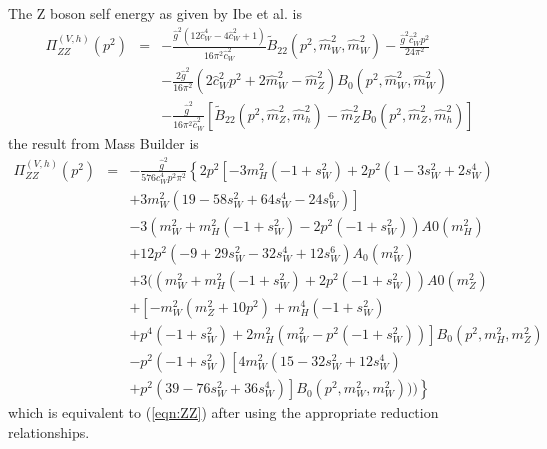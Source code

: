 \documentclass[11pt]{article}
\newcommand{\mb}{\textsf{Mass Builder} }
\begin{document}
The Z boson self energy as given by Ibe et al. \cite{Ibe2013a} is
{
\begin{eqnarray}
\Pi_{ZZ}^{(V,h)}(p^2) &=& 
-\frac{ \hat{g}^2 (12\hat{c}_W^4 - 4\hat{c}_W^2 + 1) }{16\pi^2 \hat{c}_W^2}
\tilde B_{22}(p^2, \hat{m}_W^2, \hat{m}_W^2) 
-\frac{ \hat{g}^2 \hat{c}_W^2 p^2 }{24\pi^2} \nonumber \\
&& -\frac{2\hat{g}^2}{16\pi^2}(2\hat{c}_W^2 p^2 + 2\hat{m}_W^2 - \hat{m}_Z^2)
B_0(p^2, \hat{m}_W^2, \hat{m}_W^2) \nonumber \\
&& -\frac{ \hat{g}^2 }{16\pi^2 \hat{c}_W^2}
[\tilde B_{22}(p^2, \hat{m}_Z^2, \hat{m}_h^2)\label{eqn:ZZ}
-\hat{m}_Z^2 B_0(p^2, \hat{m}_Z^2, \hat{m}_h^2) ]
\end{eqnarray}
}
the result from \mb is
{
\begin{eqnarray}
\Pi_{ZZ}^{(V,h)}(p^2) &=& 
-\frac{ \hat{g}^2} {576 c_W^4 p^2 \pi^2}\left\{
2 p^2 \left[-3 m_H^2 (-1 + s_W^2) + 2 p^2 (1 - 3 s_W^2 + 2 s_W^4) \right. \right.\nonumber\\
&& \left.+ 3 m_W^2 (19 - 58 s_W^2 + 64 s_W^4 - 24 s_W^6)\right] \nonumber\\
&&- 3 (m_W^2 + m_H^2 (-1 + s_W^2) - 2 p^2 (-1 + s_W^2)) A0\left(m_H^2\right)  \nonumber\\
 &&  + 12 p^2 (-9 + 29 s_W^2 - 32 s_W^4 + 12 s_W^6) A_0\left(m_W^2\right)  \nonumber\\
   && +3 ((m_W^2 + m_H^2 (-1 + s_W^2) + 2 p^2 (-1 + s_W^2)) A0\left(m_Z^2\right)  \nonumber\\
   &&+ \left[-m_W^2 (m_Z^2 + 10 p^2) + m_H^4 (-1 + s_W^2)\right.  \nonumber\\
   && \left. +     p^4 (-1 + s_W^2) + 2 m_H^2 (m_W^2 - p^2 (-1 + s_W^2))\right] B_0\left(p^2, m_H^2, m_Z^2\right)  \nonumber\\
&&   -    p^2 (-1 + s_W^2) \left[4 m_W^2 (15 - 32 s_W^2 + 12 s_W^4)\right.  \nonumber\\
&&  \left.      \left. +  p^2 (39 - 76 s_W^2 + 36 s_W^4)\right] B_0\left(p^2, m_W^2, m_W^2\right)))\right\}
\end{eqnarray}
}
which is equivalent to (\ref{eqn:ZZ}) after using the appropriate reduction relationships.
\end{document}
